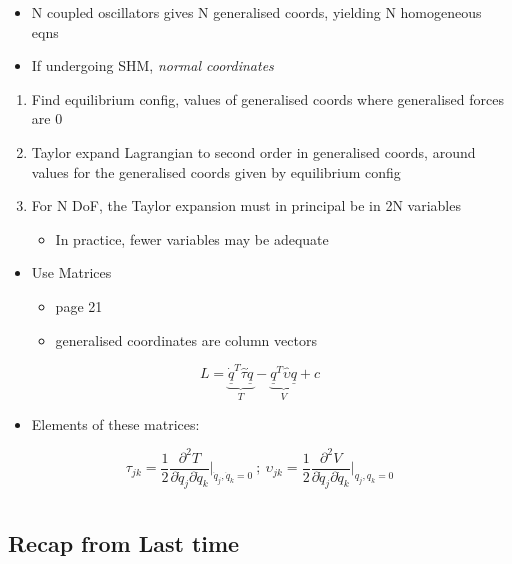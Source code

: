 \documentclass[a4paper,11pt,normalem]{article}
\begin{document}
\begin{itemize}
\item
  N coupled oscillators gives N generalised coords, yielding N
  homogeneous eqns
\item
  If undergoing SHM, \emph{normal coordinates}
\end{itemize}

\begin{enumerate}
\item
  Find equilibrium config, values of generalised coords where
  generalised forces are 0
\item
  Taylor expand Lagrangian to second order in generalised coords, around
  values for the generalised coords given by equilibrium config
\item
  For N DoF, the Taylor expansion must in principal be in 2N variables
  \begin{itemize}
  \item
    In practice, fewer variables may be adequate
  \end{itemize}
\end{enumerate}

\begin{itemize}
\item
  Use Matrices
  \begin{itemize}
  \item
    page 21
  \item
    generalised coordinates are column vectors
  \end{itemize}
\end{itemize}

\[
    L = \underbrace{\underline{\dot{q}}^T \hat{\tau} \underline{\dot{q}}}_{T} - \underbrace{\underline{q}^T \hat{\upsilon}\underline{q}}_V + c
\]

\begin{itemize}
\item
  Elements of these matrices:
\end{itemize}

\[
    \tau_{jk} = \frac{1}{2} \frac{\partial^2 T}{\partial \dot{q}_j \partial \dot{q}_k}\Bigg|_{\dot{q}_{j},\dot{q}_k = 0} ~;~ \upsilon_{jk} = \frac{1}{2} \frac{\partial^2 V}{\partial \dot{q}_j \partial \dot{q}_k}\Bigg|_{q_{j},q_k = 0}
\]

\section{}\label{lecture-7}

\subsection{Recap from Last time}\label{recap-from-last-time}
\end{document}
